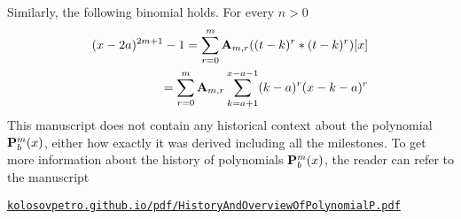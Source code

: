 Similarly, the following binomial holds.
For every $n > 0$
\begin{equation*}
    \begin{split}
    (x-2a)
        ^{2m+1} - 1 = \sum_{r=0}^{m} {\mathbf{A}} \sb{m,r} ((t-k)^r \ast (t-k)^r)[x] \\
        = \sum_{r=0}^{m} {\mathbf{A}} \sb{m,r} \sum_{k=a+1}^{x-a-1} (k-a)^r (x-k-a)^r
    \end{split}
\end{equation*}
This manuscript does not contain any historical context about the polynomial ${\mathbf{P}}\sp{m} \sb{b}(x)$,
either how exactly it was derived including all the milestones.
To get more information about the history of polynomials ${\mathbf{P}}\sp{m} \sb{b}(x)$, the reader can refer
to the manuscript
\begin{center}
    \href{https://kolosovpetro.github.io/pdf/HistoryAndOverviewOfPolynomialP.pdf}
    {\texttt{kolosovpetro.github.io/pdf/HistoryAndOverviewOfPolynomialP.pdf}}
\end{center}
